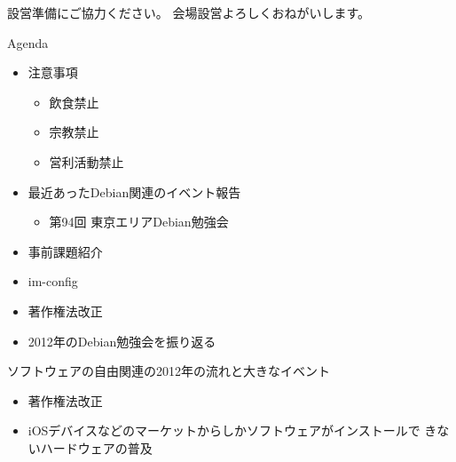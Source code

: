 \frame{\titlepage{}}

\begin{frame}{設営準備にご協力ください。}
会場設営よろしくおねがいします。
\end{frame}

\begin{frame}{Agenda}
\begin{minipage}[t]{0.45\hsize}
  \begin{itemize}
  \item 注意事項
	\begin{itemize}
	 \item 飲食禁止
	 \item 宗教禁止
	 \item 営利活動禁止
	\end{itemize}
   \item 最近あったDebian関連のイベント報告
	\begin{itemize}
        \item 第94回 東京エリアDebian勉強会
	\end{itemize}
   \item 事前課題紹介
 \end{itemize}
\end{minipage} 
\begin{minipage}[t]{0.45\hsize}
 \begin{itemize}
  \item im-config 
  \item 著作権法改正
  \item 2012年のDebian勉強会を振り返る
 \end{itemize}
\end{minipage}
\end{frame}

{\footnotesize
 
}


\begin{frame}{ソフトウェアの自由関連の2012年の流れと大きなイベント}
 \begin{itemize}
  \item 著作権法改正
  \item iOSデバイスなどのマーケットからしかソフトウェアがインストールで
	きないハードウェアの普及
 \end{itemize}
\end{frame}

